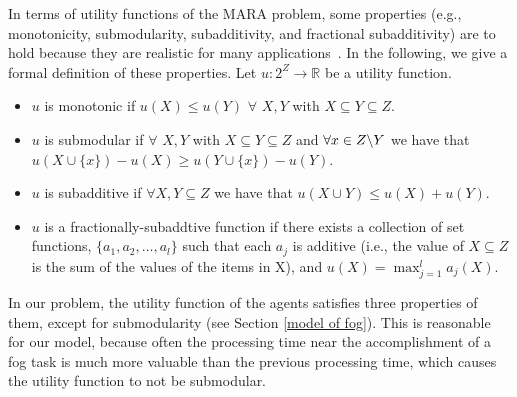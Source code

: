 \documentclass[11pt]{phdthesis}
\begin{document}
In terms of utility functions of the MARA problem, some properties (e.g., monotonicity, submodularity, subadditivity, and fractional subadditivity) are to hold because they are realistic for many applications~\citep{nisan2000bidding}. In the following, we give a formal definition of these properties. Let $ u: 2^Z \rightarrow \mathbb{R} $ be a utility function.
\begin{itemize}
    \item $ u $ is monotonic if $ u(X) \leq u(Y)$ $ \forall$ $ X, Y $ with $X \subseteq Y \subseteq Z $.
    \item $ u $ is submodular if $ \forall$ $ X, Y $ with $X \subseteq Y \subseteq Z $ and $ \forall x \in Z \char`\\ Y $ we have that $ u(X \cup \{x\}) - u(X) \geq u(Y \cup \{x\}) - u(Y) $.
    \item $ u $ is subadditive if $ \forall X,Y \subseteq{Z} $ we have that $ u(X \cup Y) \leq u(X) +u(Y) $.
    
    \item $ u $ is a fractionally-subaddtive function if there exists a collection of set functions, $ \{a_1,a_2,\ldots,a_l\}  $ such that each $ a_j $ is additive (i.e., the value of $ X \subseteq Z $ is the sum of the values of the items in X), and $ u(X) = \max_{j=1}^la_j(X) $.
\end{itemize}
In our problem, the utility function of the agents satisfies three properties of them, except for submodularity (see Section \ref{model of fog}). This is reasonable for our model, because often the processing time near the accomplishment of a fog task is much more valuable than the previous processing time, which causes the utility function to not be submodular.

\end{document}
